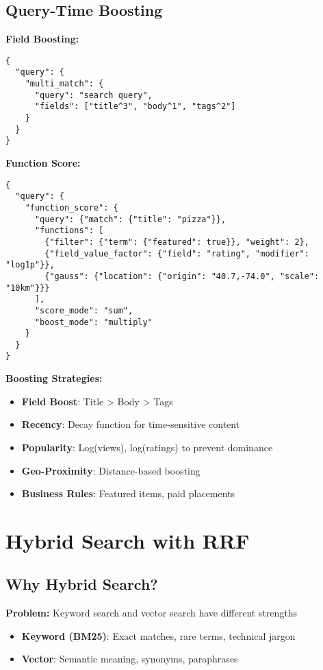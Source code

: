 \documentclass[10pt]{article}
\begin{document}
\subsection{Query-Time Boosting}

\textbf{Field Boosting:}
\begin{lstlisting}
{
  "query": {
    "multi_match": {
      "query": "search query",
      "fields": ["title^3", "body^1", "tags^2"]
    }
  }
}
\end{lstlisting}

\textbf{Function Score:}
\begin{lstlisting}
{
  "query": {
    "function_score": {
      "query": {"match": {"title": "pizza"}},
      "functions": [
        {"filter": {"term": {"featured": true}}, "weight": 2},
        {"field_value_factor": {"field": "rating", "modifier": "log1p"}},
        {"gauss": {"location": {"origin": "40.7,-74.0", "scale": "10km"}}}
      ],
      "score_mode": "sum",
      "boost_mode": "multiply"
    }
  }
}
\end{lstlisting}

\textbf{Boosting Strategies:}
\begin{itemize}
\item \textbf{Field Boost}: Title > Body > Tags
\item \textbf{Recency}: Decay function for time-sensitive content
\item \textbf{Popularity}: Log(views), log(ratings) to prevent dominance
\item \textbf{Geo-Proximity}: Distance-based boosting
\item \textbf{Business Rules}: Featured items, paid placements
\end{itemize}

\section{Hybrid Search with RRF}

\subsection{Why Hybrid Search?}

\textbf{Problem:} Keyword search and vector search have different strengths

\begin{itemize}
\item \textbf{Keyword (BM25)}: Exact matches, rare terms, technical jargon
\item \textbf{Vector}: Semantic meaning, synonyms, paraphrases
\end{itemize}
\end{document}
